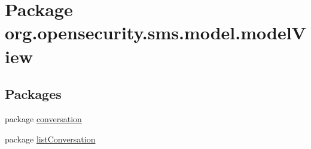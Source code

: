 \hypertarget{a00036}{\section{Package org.\+opensecurity.\+sms.\+model.\+model\+View}
\label{a00036}
}
\subsection*{Packages}
\begin{DoxyCompactItemize}
\item 
package \hyperlink{a00037}{conversation}
\item 
package \hyperlink{a00038}{list\+Conversation}
\end{DoxyCompactItemize}
